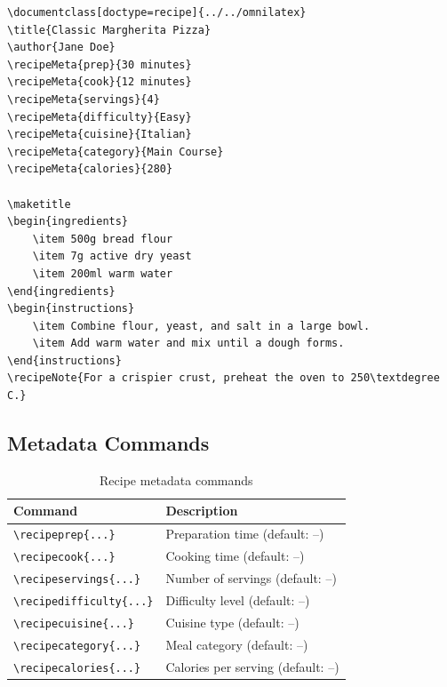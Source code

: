 \begin{verbatim}
\documentclass[doctype=recipe]{../../omnilatex}
\title{Classic Margherita Pizza}
\author{Jane Doe}
\recipeMeta{prep}{30 minutes}
\recipeMeta{cook}{12 minutes}
\recipeMeta{servings}{4}
\recipeMeta{difficulty}{Easy}
\recipeMeta{cuisine}{Italian}
\recipeMeta{category}{Main Course}
\recipeMeta{calories}{280}

\maketitle
\begin{ingredients}
    \item 500g bread flour
    \item 7g active dry yeast
    \item 200ml warm water
\end{ingredients}
\begin{instructions}
    \item Combine flour, yeast, and salt in a large bowl.
    \item Add warm water and mix until a dough forms.
\end{instructions}
\recipeNote{For a crispier crust, preheat the oven to 250\textdegree C.}

\end{verbatim}

\subsection{Metadata Commands}

\begin{table}[htbp]
    \centering
    \caption{Recipe metadata commands}
    \label{tab:recipe-commands}
    \begin{tabular}{@{} l p{7.5cm} @{}}
        \toprule
        \textbf{Command} & \textbf{Description} \\
        \midrule
        \texttt{\textbackslash recipeprep\{...\}}       & Preparation time (default: --) \\
        \texttt{\textbackslash recipecook\{...\}}       & Cooking time (default: --) \\
        \texttt{\textbackslash recipeservings\{...\}}   & Number of servings (default: --) \\
        \texttt{\textbackslash recipedifficulty\{...\}} & Difficulty level (default: --) \\
        \texttt{\textbackslash recipecuisine\{...\}}    & Cuisine type (default: --) \\
        \texttt{\textbackslash recipecategory\{...\}}   & Meal category (default: --) \\
        \texttt{\textbackslash recipecalories\{...\}}   & Calories per serving (default: --) \\
        \bottomrule
    \end{tabular}
\end{table}

